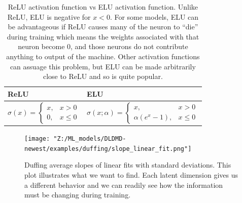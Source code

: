 \begin{table}[hb!]
    \centering
    \begin{minipage}{\textwidth}
        \begin{tabularx}{\textwidth}{|>{\centering\arraybackslash}X|>{\centering\arraybackslash}X|} \hline%
            ReLU & ELU \\ \hline \hline
            $\sigma(x) = \begin{cases}
                x, & x > 0 \\
                0, & x \leq 0
            \end{cases}$ & 
            $\sigma(x; \alpha) = \begin{cases}
                x, & x > 0 \\
                \alpha(e^x - 1), & x \leq 0
            \end{cases}$ \\ \hline
        \end{tabularx}
    \end{minipage}
    \caption{ReLU activation function vs ELU activation function. Unlike ReLU, ELU is negative 
    for $x < 0$. For some models, ELU can be advantageous if ReLU causes many of the neuron to
    ``die'' during training which means the weights associated with that neuron become 0, and
    those neurons do not contribute anything to output of the machine. Other activation functions
    can assuage this problem, but ELU can be made arbitrarily close to ReLU and so is quite
    popular.}
    \label{table:elu vs relu}
\end{table}

\begin{figure}[!ht]
    \centering
    \begin{minipage}{\textwidth}
        \texttt{[image: "Z:/ML\_models/DLDMD-newest/examples/duffing/slope\_linear\_fit.png"]} 
    \end{minipage}%
    \caption{Duffing average slopes of linear fits with standard deviations. This plot illustrates what we want 
    to find. Each latent dimension gives us a different behavior and we can readily see how the information must
    be changing during training.}
    \label{fig:duffing average slopes}
\end{figure}


